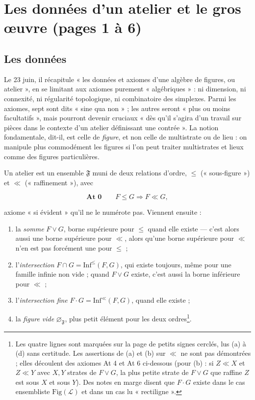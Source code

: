 \documentclass[11pt,a4paper]{article}
\begin{document}
\section*{Les données d'un atelier et le gros œuvre (pages 1 à 6)}

\subsection*{Les données}

Le 23 juin, il récapitule « les données et axiomes d'une algèbre de figures, ou
atelier », en se limitant aux axiomes purement « algébriques » : ni dimension,
ni connexité, ni régularité topologique, ni combinatoire des simplexes. Parmi
les axiomes, sept sont dits « sine qua non » ; les autres seront « plus ou moins
facultatifs », mais pourront devenir cruciaux « dès qu'il s'agira d'un travail
sur pièces dans le contexte d'un atelier définissant une contrée ». La notion
fondamentale, dit-il, est celle de \emph{figure}, et non celle de multistrate
ou de lieu : on manipule plus commodément les figures si l'on peut traiter
multistrates et lieux comme des figures particulières.

Un atelier est un ensemble $\mathfrak{F}$ muni de deux relations d'ordre,
$\leq$ (« sous-figure ») et $\ll$ (« raffinement »), avec

\[
\textbf{At 0} \qquad F \leq G \Longrightarrow F \ll G ,
\]

axiome « si évident » qu'il ne le numérote pas. Viennent ensuite :
\begin{enumerate}
\item[(a)] la \emph{somme} $F \vee G$, borne supérieure pour $\leq$ quand elle
existe --- c'est alors aussi une borne supérieure pour $\ll$, alors qu'une borne
supérieure pour $\ll$ n'en est pas forcément une pour $\leq$ ;
\item[(b)] l'\emph{intersection} $F \cap G = \mathrm{Inf}^{\leq}(F, G)$, qui
existe toujours, même pour une famille infinie non vide ; quand $F \vee G$
existe, c'est aussi la borne inférieure pour $\ll$ ;
\item[(c)] l'\emph{intersection fine} $F \cdot G = \mathrm{Inf}^{\ll}(F, G)$,
quand elle existe ;
\item[(d)] la \emph{figure vide} $\varnothing_{\mathfrak{F}}$, plus petit élément
pour les deux ordres\footnote{Les quatre lignes sont marquées sur la page de
petits signes cerclés, lus (a) à (d) sans certitude. Les assertions de (a) et
(b) sur $\ll$ ne sont pas démontrées ; elles découlent des axiomes At 4 et At 6
ci-dessous (pour (b) : si $Z \ll X$ et $Z \ll Y$ avec $X, Y$ strates de $F
\vee G$, la plus petite strate de $F \vee G$ que raffine $Z$ est sous $X$ et sous
$Y$). Des notes en marge disent que $F \cdot G$ existe dans le cas ensembliste
$\mathrm{Fig}(\mathcal{L})$ et dans un cas lu « rectiligne ».}.
\end{enumerate}
\end{document}
